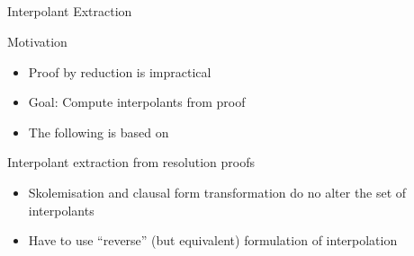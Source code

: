 \documentclass[final,compress]{beamer}
\begin{document}
\subsection{}
\begin{frame}{Interpolant Extraction}
	\begin{block}{Motivation}
		\begin{itemize}
			\item Proof by reduction is impractical
			\item Goal: Compute interpolants from proof
			\item The following is based on \cite{Huang95}
		\end{itemize}
	\end{block}
	\pause
	\begin{block}{Interpolant extraction from resolution proofs}
		\begin{itemize}
			\item Skolemisation and clausal form transformation do no alter the set of interpolants
			\item Have to use ``reverse'' (but equivalent) formulation of interpolation
		\end{itemize}
	\end{block}

\end{frame}
\newcommand{\fakemulticolwidth}{0.28\textwidth}
	\newcommand{\proofwidth}{0.18\textwidth}
	\newcommand{\proofindent}{\hspace*{11.21em}}

	\newcommand{\stagearrow}{{\Large$\Downarrow$}}
\end{document}

